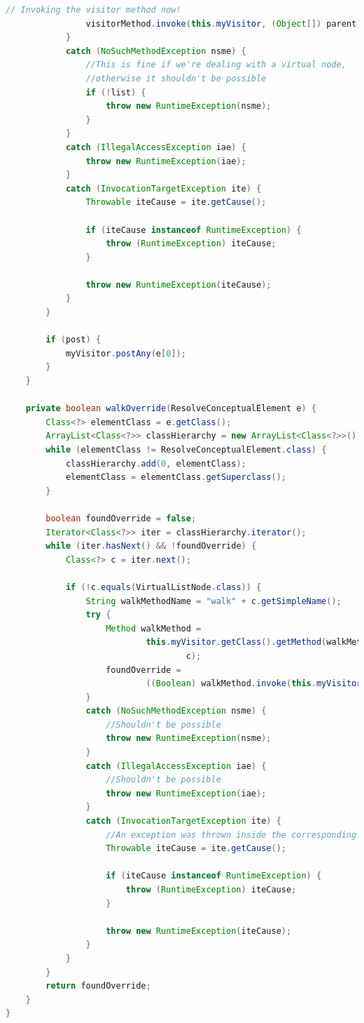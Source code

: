 \documentclass[times]{speauth}
\begin{document}
\begin{lstlisting}[language=java,caption={TreeWalker.java}]
                // Invoking the visitor method now!
                visitorMethod.invoke(this.myVisitor, (Object[]) parent);
            }
            catch (NoSuchMethodException nsme) {
                //This is fine if we're dealing with a virtual node,
                //otherwise it shouldn't be possible
                if (!list) {
                    throw new RuntimeException(nsme);
                }
            }
            catch (IllegalAccessException iae) {
                throw new RuntimeException(iae);
            }
            catch (InvocationTargetException ite) {
                Throwable iteCause = ite.getCause();

                if (iteCause instanceof RuntimeException) {
                    throw (RuntimeException) iteCause;
                }

                throw new RuntimeException(iteCause);
            }
        }

        if (post) {
            myVisitor.postAny(e[0]);
        }
    }

    private boolean walkOverride(ResolveConceptualElement e) {
        Class<?> elementClass = e.getClass();
        ArrayList<Class<?>> classHierarchy = new ArrayList<Class<?>>();
        while (elementClass != ResolveConceptualElement.class) {
            classHierarchy.add(0, elementClass);
            elementClass = elementClass.getSuperclass();
        }

        boolean foundOverride = false;
        Iterator<Class<?>> iter = classHierarchy.iterator();
        while (iter.hasNext() && !foundOverride) {
            Class<?> c = iter.next();

            if (!c.equals(VirtualListNode.class)) {
                String walkMethodName = "walk" + c.getSimpleName();
                try {
                    Method walkMethod =
                            this.myVisitor.getClass().getMethod(walkMethodName,
                                    c);
                    foundOverride =
                            ((Boolean) walkMethod.invoke(this.myVisitor, e));
                }
                catch (NoSuchMethodException nsme) {
                    //Shouldn't be possible
                    throw new RuntimeException(nsme);
                }
                catch (IllegalAccessException iae) {
                    //Shouldn't be possible
                    throw new RuntimeException(iae);
                }
                catch (InvocationTargetException ite) {
                    //An exception was thrown inside the corresponding walk method
                    Throwable iteCause = ite.getCause();

                    if (iteCause instanceof RuntimeException) {
                        throw (RuntimeException) iteCause;
                    }

                    throw new RuntimeException(iteCause);
                }
            }
        }
        return foundOverride;
    }
}
\end{lstlisting}
\end{document}
